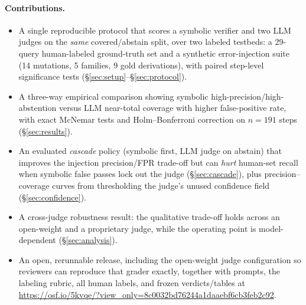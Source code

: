 \paragraph{Contributions.}
\begin{itemize}
    \item A single reproducible protocol that scores a symbolic verifier and two
    LLM judges on the \emph{same} covered/abstain split, over two labeled
    testbeds: a 29-query human-labeled ground-truth set and a synthetic
    error-injection suite (14 mutations, 5 families, 9 gold derivations), with
    paired step-level significance tests
    (\S\ref{sec:setup}--\S\ref{sec:protocol}).
    \item A three-way empirical comparison showing symbolic
    high-precision/high-abstention versus LLM near-total coverage with higher
    false-positive rate, with exact McNemar tests and Holm--Bonferroni
    correction on $n{=}191$ steps (\S\ref{sec:results}).
    \item An evaluated \emph{cascade} policy (symbolic first, LLM judge on
    abstain) that improves the injection precision/FPR trade-off but can
    \emph{hurt} human-set recall when symbolic false passes lock out the judge
    (\S\ref{sec:cascade}), plus precision--coverage curves from thresholding
    the judge's unused confidence field (\S\ref{sec:confidence}).
    \item A cross-judge robustness result: the qualitative trade-off holds across
    an open-weight and a proprietary judge, while the operating point is
    model-dependent (\S\ref{sec:analysis}).
    \item An open, rerunnable release, including the open-weight judge
    configuration so reviewers can reproduce that grader exactly, together with
    prompts, the labeling rubric, all human labels, and frozen verdicts/tables
    at \url{https://osf.io/5kvqe/?view_only=8c0032bd76244a1daaebf6cb3feb2c92}.
\end{itemize}
